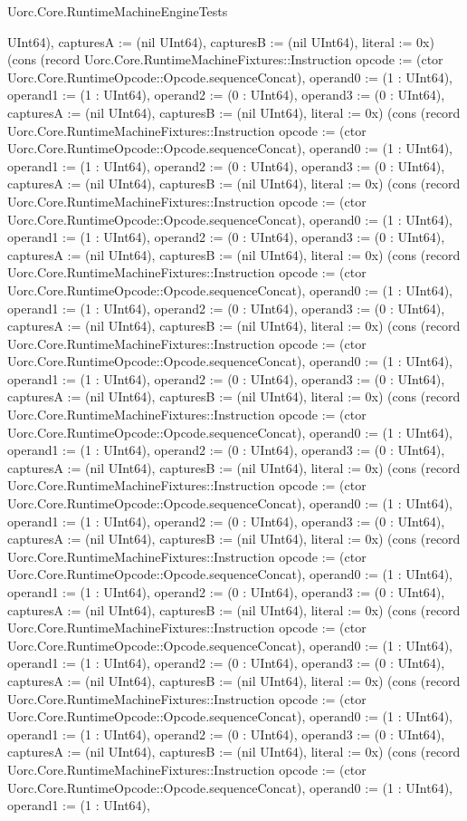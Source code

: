 \begin{lexlean}{Uorc.Core.RuntimeMachineEngineTests}
\begin{semanticmodule}
{UInt64), capturesA := (nil UInt64), capturesB := (nil UInt64), literal := 0x}) (cons (record Uorc.Core.RuntimeMachineFixtures::Instruction {opcode := (ctor Uorc.Core.RuntimeOpcode::Opcode.sequenceConcat), operand0 := (1 : UInt64), operand1 := (1 : UInt64), operand2 := (0 : UInt64), operand3 := (0 : UInt64), capturesA := (nil UInt64), capturesB := (nil UInt64), literal := 0x}) (cons (record Uorc.Core.RuntimeMachineFixtures::Instruction {opcode := (ctor Uorc.Core.RuntimeOpcode::Opcode.sequenceConcat), operand0 := (1 : UInt64), operand1 := (1 : UInt64), operand2 := (0 : UInt64), operand3 := (0 : UInt64), capturesA := (nil UInt64), capturesB := (nil UInt64), literal := 0x}) (cons (record Uorc.Core.RuntimeMachineFixtures::Instruction {opcode := (ctor Uorc.Core.RuntimeOpcode::Opcode.sequenceConcat), operand0 := (1 : UInt64), operand1 := (1 : UInt64), operand2 := (0 : UInt64), operand3 := (0 : UInt64), capturesA := (nil UInt64), capturesB := (nil UInt64), literal := 0x}) (cons (record Uorc.Core.RuntimeMachineFixtures::Instruction {opcode := (ctor Uorc.Core.RuntimeOpcode::Opcode.sequenceConcat), operand0 := (1 : UInt64), operand1 := (1 : UInt64), operand2 := (0 : UInt64), operand3 := (0 : UInt64), capturesA := (nil UInt64), capturesB := (nil UInt64), literal := 0x}) (cons (record Uorc.Core.RuntimeMachineFixtures::Instruction {opcode := (ctor Uorc.Core.RuntimeOpcode::Opcode.sequenceConcat), operand0 := (1 : UInt64), operand1 := (1 : UInt64), operand2 := (0 : UInt64), operand3 := (0 : UInt64), capturesA := (nil UInt64), capturesB := (nil UInt64), literal := 0x}) (cons (record Uorc.Core.RuntimeMachineFixtures::Instruction {opcode := (ctor Uorc.Core.RuntimeOpcode::Opcode.sequenceConcat), operand0 := (1 : UInt64), operand1 := (1 : UInt64), operand2 := (0 : UInt64), operand3 := (0 : UInt64), capturesA := (nil UInt64), capturesB := (nil UInt64), literal := 0x}) (cons (record Uorc.Core.RuntimeMachineFixtures::Instruction {opcode := (ctor Uorc.Core.RuntimeOpcode::Opcode.sequenceConcat), operand0 := (1 : UInt64), operand1 := (1 : UInt64), operand2 := (0 : UInt64), operand3 := (0 : UInt64), capturesA := (nil UInt64), capturesB := (nil UInt64), literal := 0x}) (cons (record Uorc.Core.RuntimeMachineFixtures::Instruction {opcode := (ctor Uorc.Core.RuntimeOpcode::Opcode.sequenceConcat), operand0 := (1 : UInt64), operand1 := (1 : UInt64), operand2 := (0 : UInt64), operand3 := (0 : UInt64), capturesA := (nil UInt64), capturesB := (nil UInt64), literal := 0x}) (cons (record Uorc.Core.RuntimeMachineFixtures::Instruction {opcode := (ctor Uorc.Core.RuntimeOpcode::Opcode.sequenceConcat), operand0 := (1 : UInt64), operand1 := (1 : UInt64), operand2 := (0 : UInt64), operand3 := (0 : UInt64), capturesA := (nil UInt64), capturesB := (nil UInt64), literal := 0x}) (cons (record Uorc.Core.RuntimeMachineFixtures::Instruction {opcode := (ctor Uorc.Core.RuntimeOpcode::Opcode.sequenceConcat), operand0 := (1 : UInt64), operand1 := (1 : UInt64), operand2 := (0 : UInt64), operand3 := (0 : UInt64), capturesA := (nil UInt64), capturesB := (nil UInt64), literal := 0x}) (cons (record Uorc.Core.RuntimeMachineFixtures::Instruction {opcode := (ctor Uorc.Core.RuntimeOpcode::Opcode.sequenceConcat), operand0 := (1 : UInt64), operand1 := (1 : UInt64), }
\end{semanticmodule}
\end{lexlean}
